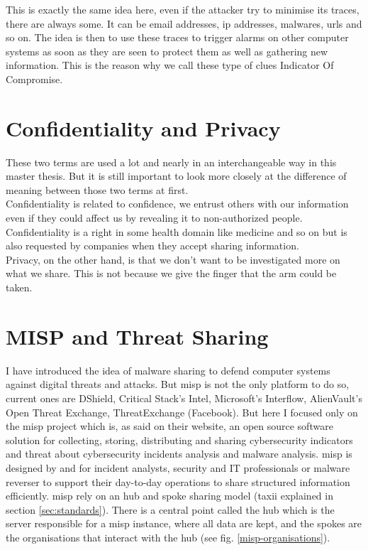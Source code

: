 \documentclass{eplmastersthesis}
\begin{document}
This is exactly the same idea here, even if the attacker try to minimise its traces, there are always some. It can be email addresses, \gls{ip} addresses, malwares, \gls{url}s and so on.
The idea is then to use these traces to trigger alarms on other computer systems as soon as they are seen to protect them as well as gathering new information. This is the reason why we call these type of clues Indicator Of Compromise.

\section{Confidentiality and Privacy}
These two terms are used a lot and nearly in an interchangeable way in this master thesis. But it is still important to look more closely at the difference of meaning between those two terms at first.\\

Confidentiality is related to confidence, we entrust others with our information even if they could affect us by revealing it to non-authorized people. Confidentiality is a right in some health domain like medicine and so on but is also requested by companies when they accept sharing information.\\

Privacy, on the other hand, is that we don't want to be investigated more on what we share. This is not because we give the finger that the arm could be taken.


\section{MISP and Threat Sharing}
I have introduced the idea of malware sharing to defend computer systems against digital threats and attacks. But \gls{misp} is not the only platform to do so, current ones are DShield, Critical Stack’s Intel, Microsoft’s Interflow, AlienVault’s Open Threat Exchange, ThreatExchange (Facebook).
But here I focused only on the \gls{misp} project which is, as said on their website, an open source software solution for collecting, storing, distributing and sharing cybersecurity indicators and threat about cybersecurity incidents analysis and malware analysis. \gls{misp} is designed by and for incident analysts, security and IT professionals or malware reverser to support their day-to-day operations to share structured information efficiently.
\gls{misp} rely on an hub and spoke sharing model (\gls{taxii} \cite{taxiiWebsite} explained in section \ref{sec:standards}). There is a central point called the hub which is the server responsible for a \gls{misp} instance, where all data are kept, and the spokes are the organisations that interact with the hub (see fig. \ref{misp-organisations}).\\
\end{document}
